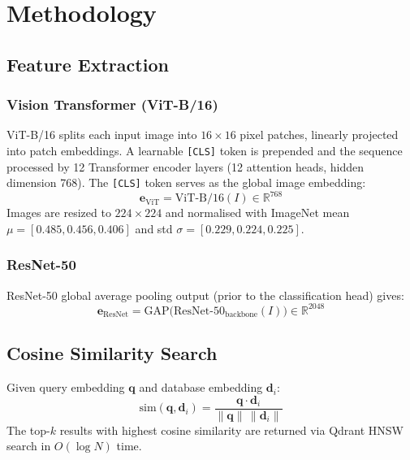 \documentclass[conference]{IEEEtran}
\begin{document}
\section{Methodology}

\subsection{Feature Extraction}

\subsubsection{Vision Transformer (ViT-B/16)}
ViT-B/16 \cite{ref_vit_original} splits each input image into $16{\times}16$ pixel patches, linearly projected into patch embeddings. A learnable \texttt{[CLS]} token is prepended and the sequence processed by 12 Transformer encoder layers (12 attention heads, hidden dimension 768). The \texttt{[CLS]} token serves as the global image embedding:
\begin{equation}
  \mathbf{e}_{\mathrm{ViT}} = \mathrm{ViT\text{-}B/16}(I) \in \mathbb{R}^{768}
\end{equation}
Images are resized to $224{\times}224$ and normalised with ImageNet mean $\mu=[0.485, 0.456, 0.406]$ and std $\sigma=[0.229, 0.224, 0.225]$.

\subsubsection{ResNet-50}
ResNet-50 \cite{ref_resnet} global average pooling output (prior to the classification head) gives:
\begin{equation}
  \mathbf{e}_{\mathrm{ResNet}} = \mathrm{GAP}\bigl(\mathrm{ResNet\text{-}50}_{\mathrm{backbone}}(I)\bigr) \in \mathbb{R}^{2048}
\end{equation}

\subsection{Cosine Similarity Search}

Given query embedding $\mathbf{q}$ and database embedding $\mathbf{d}_i$:
\begin{equation}
  \mathrm{sim}(\mathbf{q}, \mathbf{d}_i) = \frac{\mathbf{q} \cdot \mathbf{d}_i}{\|\mathbf{q}\|\,\|\mathbf{d}_i\|}
\end{equation}
The top-$k$ results with highest cosine similarity are returned via Qdrant HNSW search in $O(\log N)$ time.
\end{document}
